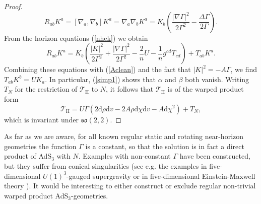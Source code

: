 \documentclass[11pt, reqno]{amsart}
\theoremstyle{plain}
\theoremstyle{definition}
\numberwithin{equation}{section}
\begin{document}
\begin{proof}
    \begin{equation*}
        R_{ab}K^a = [\nabla_a,\nabla_b]K^a = \nabla_a\nabla_bK^a = K_b\left(\frac{\vert \nabla \Gamma \vert^2}{2\Gamma^2} - \frac{\Delta \Gamma}{2\Gamma}\right).
    \end{equation*}
    From the horizon equations (\ref{nhek}) we obtain 
    \begin{equation*}
        R_{ab}K^a = K_b\left(\frac{\vert K \vert^2}{2\Gamma^2} + \frac{\vert \nabla \Gamma \vert^2}{2\Gamma^2} - \frac 2n U - 
        \frac 1n g^{cd}T_{cd}\right) + T_{ab}K^a.
    \end{equation*}
    Combining these equations with (\ref{Aclean}) and the fact that $\vert K \vert^2 = - A\Gamma$, we find $T_{ab}K^b = UK_a$. In particular, (\ref{simp1}) shows that $\alpha$ and $\beta$ both vanish. Writing $T_N$ for the restriction of $\mathcal{T}_{\text{H}}$ to $N$, it follows that $\mathcal{T}_{\text{H}}$ is of the warped product form
    \begin{equation}
        \mathcal{T}_{\text{H}} = U\Gamma(2\text{d}\rho\text{d}v - 2A\rho\text{d}\chi\text{d}v - A\text{d}\chi^2) + T_N,
    \end{equation}
    which is invariant under $\mathfrak{so}(2,2)$.
\end{proof}
As far as we are aware, for all known regular static and rotating near-horizon geometries the function $\Gamma$ is a constant, so that the solution is in fact a direct product of AdS$_3$ with $N$. Examples with non-constant $\Gamma$ have been constructed, but they suffer from conical singularities (see e.g. the examples in five-dimensional $U(1)^3$-gauged supergravity \cite{KL07} or in five-dimensional Einstein-Maxwell theory \cite{KL09s}). It would be interesting to either construct or exclude regular non-trivial warped product AdS$_3$-geometries.
\end{document}
